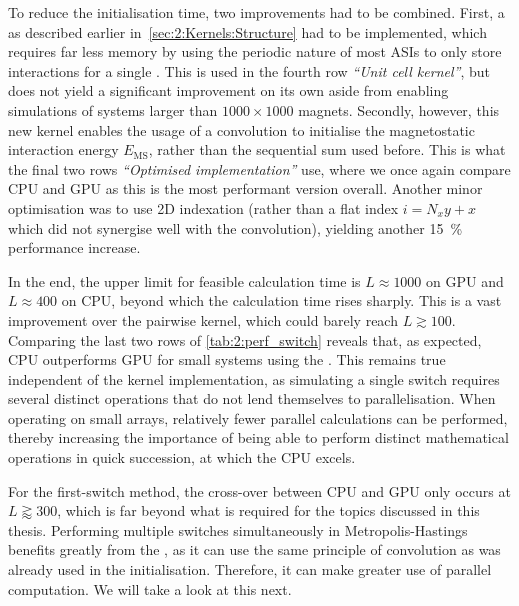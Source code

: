 To reduce the initialisation time, two improvements had to be combined.
First, a  as described earlier in~\cref{sec:2:Kernels:Structure} had to be implemented, which requires far less memory by using the periodic nature of most ASIs to only store interactions for a single .
This is used in the fourth row \textit{``Unit cell kernel''}, but does not yield a significant improvement on its own aside from enabling simulations of systems larger than $1000 \times 1000$ magnets.
Secondly, however, this new kernel enables the usage of a convolution to initialise the magnetostatic interaction energy $E_\mathrm{MS}$, rather than the sequential sum used before.
This is what the final two rows \textit{``Optimised implementation''} use, where we once again compare CPU and GPU as this is the most performant version overall.
Another minor optimisation was to use 2D indexation (rather than a flat index $i = N_x y + x$ which did not synergise well with the convolution), yielding another \SI{15}{\percent} performance increase. \\\par

In the end, the upper limit for feasible calculation time is $L \approx 1000$ on GPU and $L \approx 400$ on CPU, beyond which the calculation time rises sharply.
This is a vast improvement over the pairwise kernel, which could barely reach $L \gtrsim 100$.
Comparing the last two rows of \cref{tab:2:perf_switch} reveals that, as expected, CPU outperforms GPU for small systems using the .
This remains true independent of the kernel implementation, as simulating a single switch requires several distinct operations that do not lend themselves to parallelisation.
When operating on small arrays, relatively fewer parallel calculations can be performed, thereby increasing the importance of being able to perform distinct mathematical operations in quick succession, at which the CPU excels. \par
For the first-switch method, the cross-over between CPU and GPU only occurs at $L \gtrapprox 300$, which is far beyond what is required for the topics discussed in this thesis.
Performing multiple switches simultaneously in Metropolis-Hastings benefits greatly from the , as it can use the same principle of convolution as was already used in the initialisation.
Therefore, it can make greater use of parallel computation.
We will take a look at this next.

